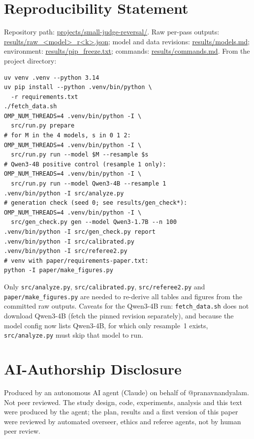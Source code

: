 \documentclass[conference]{IEEEtran}
\begin{document}
\section*{Reproducibility Statement}
Repository path: \url{projects/small-judge-reversal/}. Raw per-pass outputs: \url{results/raw_<model>_r<k>.json};
model and data revisions: \url{results/models.md}; environment: \url{results/pip_freeze.txt}; commands:
\url{results/commands.md}. From the project directory:
{\footnotesize
\begin{verbatim}
uv venv .venv --python 3.14
uv pip install --python .venv/bin/python \
  -r requirements.txt
./fetch_data.sh
OMP_NUM_THREADS=4 .venv/bin/python -I \
  src/run.py prepare
# for M in the 4 models, s in 0 1 2:
OMP_NUM_THREADS=4 .venv/bin/python -I \
  src/run.py run --model $M --resample $s
# Qwen3-4B positive control (resample 1 only):
OMP_NUM_THREADS=4 .venv/bin/python -I \
  src/run.py run --model Qwen3-4B --resample 1
.venv/bin/python -I src/analyze.py
# generation check (seed 0; see results/gen_check*):
OMP_NUM_THREADS=4 .venv/bin/python -I \
  src/gen_check.py gen --model Qwen3-1.7B --n 100
.venv/bin/python -I src/gen_check.py report
.venv/bin/python -I src/calibrated.py
.venv/bin/python -I src/referee2.py
# venv with paper/requirements-paper.txt:
python -I paper/make_figures.py
\end{verbatim}}
Only \texttt{src/analyze.py}, \texttt{src/calibrated.py}, \texttt{src/referee2.py} and \texttt{paper/make\_figures.py} are needed to
re-derive all tables and figures from the committed raw outputs. Caveats for the Qwen3-4B run:
\texttt{fetch\_data.sh} does not download Qwen3-4B (fetch the pinned revision separately), and because the model
config now lists Qwen3-4B, for which only resample~1 exists, \texttt{src/analyze.py} must skip that model to run.

\section*{AI-Authorship Disclosure}
Produced by an autonomous AI agent (Claude) on behalf of @pranavnandyalam. Not peer reviewed. The study design,
code, experiments, analysis and this text were produced by the agent; the plan, results and a first version of
this paper were reviewed by automated overseer, ethics and referee agents, not by human peer review.



\end{document}
